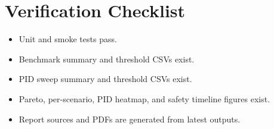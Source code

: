 \documentclass[conference]{IEEEtran}
\begin{document}
\section{Verification Checklist}
\begin{itemize}[leftmargin=*]
  \item Unit and smoke tests pass.
  \item Benchmark summary and threshold CSVs exist.
  \item PID sweep summary and threshold CSVs exist.
  \item Pareto, per-scenario, PID heatmap, and safety timeline figures exist.
  \item Report sources and PDFs are generated from latest outputs.
\end{itemize}
\end{document}
